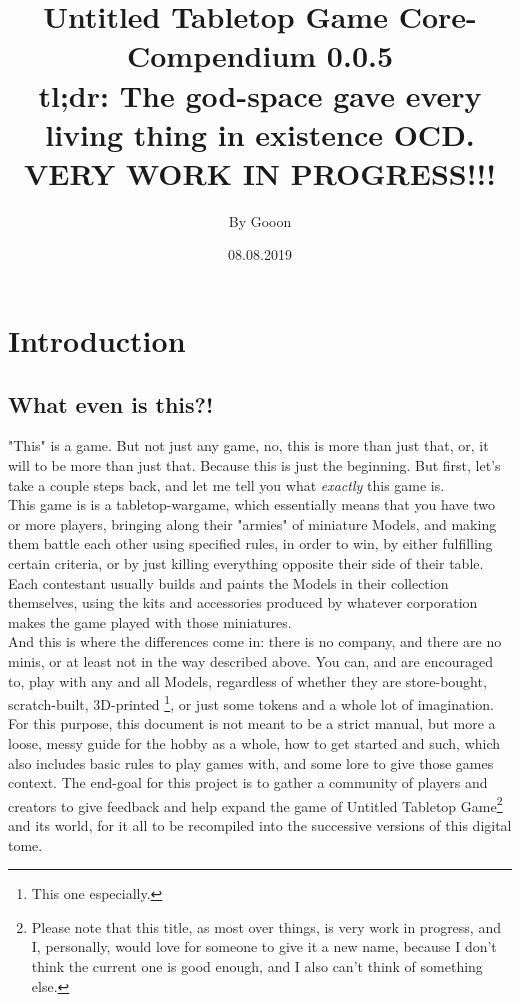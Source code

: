 \documentclass[a4paper,12pt]{report}
\begin{document}
\title{\Large{\textbf{Untitled Tabletop Game Core-Compendium 0.0.5\\ tl;dr: The god-space gave every living thing in existence  OCD.\\ VERY WORK IN PROGRESS!!!}}}
\author{By Gooon}
\date{08.08.2019}

\maketitle
\let\cleardoublepage\clearpage
\tableofcontents
\pagebreak

\chapter{Introduction}
\section{What even is this?!}
"This" is a game. But not just any game, no, this is more than just that, or,  it will to be more than just that. Because this is just the beginning. But first, let's take a couple steps back, and let me tell you what \textit{exactly} this game is. \\
This game is is a tabletop-wargame, which essentially means that you have two or more players, bringing along their "armies" of miniature Models, and making them battle each other using specified rules, in order to win, by either fulfilling certain criteria, or by just killing everything opposite their side of their table. Each contestant usually builds and paints the Models in their collection themselves, using the kits and accessories produced by whatever corporation makes the game played with those miniatures. \\
And this is where the differences come in: there is no company, and there are no minis, or at least not in the way described above. You can, and are encouraged to, play with any and all Models, regardless of whether they are store-bought, scratch-built, 3D-printed \footnote{This one especially.}, or just some tokens and a whole lot of imagination. For this purpose, this document is not meant to be a strict manual, but more a loose, messy guide for the hobby as a whole, how to get started and such, which also includes basic rules to play games with, and some lore to give those games context. The end-goal for this project is to gather a community of players and creators to give feedback and help expand the game of Untitled Tabletop Game\footnote{Please note that this title, as most over things, is very work in progress, and I, personally, would love for someone to give it a new name, because I don't think the current one is good enough, and I also can't think of something else.} and its world, for it all to be recompiled into the successive versions of this digital tome.
\end{document}
